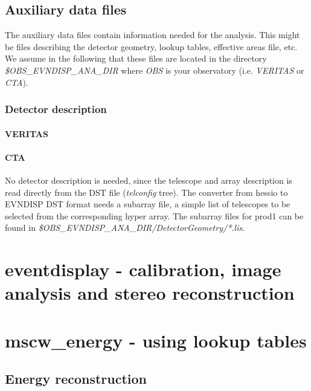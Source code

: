 \documentclass[titlepage,a4paper,twoside,11pt]{report}
\begin{document}
\section{Auxiliary data files}
\label{SECTION.AUXFILE}

The auxiliary data files contain information needed for the analysis. 
This might be files describing the detector geometry, lookup tables, effective areas file, etc.
We assume in the following that these files are located in the
directory {\it \$OBS\_EVNDISP\_ANA\_DIR} where {\it OBS} is your
observatory (i.e. {\it VERITAS} or {\it CTA}).

\subsection{Detector description}

\subsubsection{VERITAS}

\subsubsection{CTA}

No detector description is needed, since the telescope and array description is read directly from the DST file ({\it telconfig} tree).
The converter from hessio to EVNDISP DST format needs a subarray file, a simple list of telescopes to be selected from the corresponding hyper array. 
The subarray files for prod1 can be found in {\it \$OBS\_EVNDISP\_ANA\_DIR/DetectorGeometry/*.lis}.

\chapter{eventdisplay - calibration, image analysis and stereo reconstruction}

\chapter{mscw\_energy - using lookup tables}

\section{Energy reconstruction}
\label{SECTION.ENERGYRECONSTRUCTION} 


\end{document}
